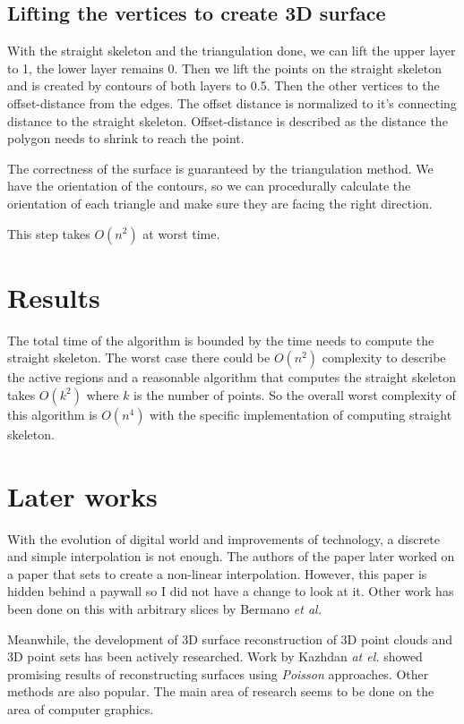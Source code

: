 \documentclass[11pt]{article}
\begin{document}
\subsection{Lifting the vertices to create 3D surface}

With the straight skeleton and the triangulation done, we can lift the upper layer to 1, the lower layer remains 0. Then we lift the points on the straight skeleton and is created by contours of both layers to 0.5. Then the other vertices to the offset-distance from the edges. The offset distance is normalized to it's connecting distance to the straight skeleton. Offset-distance is described as the distance the polygon needs to shrink to reach the point.

The correctness of the surface is guaranteed by the triangulation method. We have the orientation of the contours, so we can procedurally calculate the orientation of each triangle and make sure they are facing the right direction.

This step takes $O(n^2)$ at worst time.

\section{Results}

The total time of the algorithm is bounded by the time needs to compute the straight skeleton. The worst case there could be $O(n^2)$ complexity to describe the active regions and a reasonable algorithm that computes the straight skeleton takes $O(k^2)$ where $k$ is the number of points. So the overall worst complexity of this algorithm is $O(n^4)$ with the specific implementation of computing straight skeleton.

\section{Later works}
With the evolution of digital world and improvements of technology, a discrete and simple interpolation is not enough. The authors of the paper later worked on a paper that sets to create a non-linear interpolation.\cite{barequet08} However, this paper is hidden behind a paywall so I did not have a change to look at it. Other work has been done on this with arbitrary slices by Bermano {\it et al.} \cite{bermano11}

Meanwhile, the development of 3D surface reconstruction of 3D point clouds and 3D point sets has been actively researched. Work by Kazhdan {\it at el.} \cite{kazhdan06} \cite{kazhdan13} showed promising results of reconstructing surfaces using {\it Poisson} approaches. Other methods are also popular. The main area of research seems to be done on the area of computer graphics.
\end{document}
